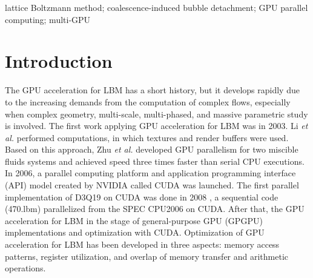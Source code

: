 \documentclass[10pt]{elsarticle}
\begin{document}
\begin{frontmatter}
\begin{keyword}
lattice Boltzmann method; coalescence-induced bubble detachment; GPU parallel computing; multi-GPU


\end{keyword}

\end{frontmatter}


\section{Introduction}
\label{sec:intro}
The GPU acceleration for LBM has a short history, but it develops rapidly due to the increasing demands from the computation of complex flows, especially when complex geometry, multi-scale, multi-phased, and massive parametric study is involved. The first work applying GPU acceleration for LBM\cite{rf:Li03} was in 2003. Li {\it et al.} performed computations, in which textures and render buffers were used. Based on this approach, Zhu {\it et al.} developed GPU parallelism for two miscible fluids systems and achieved speed three times faster than serial CPU executions. In 2006, a parallel computing platform and application programming interface (API) model created by NVIDIA\cite{rf:CUDA} called CUDA was launched.  The first parallel implementation of D3Q19 on CUDA was done in 2008 \cite{rf:Ryoo08}, a sequential code (470.lbm) parallelized from the SPEC CPU2006\cite{rf:Henning06} on CUDA. After that, the GPU acceleration for LBM in the stage of general-purpose GPU (GPGPU) implementations and optimization with CUDA. Optimization of GPU acceleration for LBM has been developed in three aspects: memory access patterns, register utilization, and overlap of memory transfer and arithmetic operations.
\end{document}
